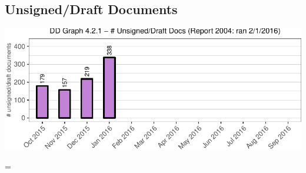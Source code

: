 \documentclass{article}\usepackage[]{graphicx}\usepackage[]{color}
\makeatletter
\def\maxwidth{ %
  \ifdim\Gin@nat@width>\linewidth
    \linewidth
  \else
    \Gin@nat@width
  \fi
}
\newenvironment{knitrout}{}{} %
\newenvironment{absolutelynopagebreak}
  {\par\nobreak\vfil\penalty0\vfilneg
   \vtop\bgroup}
  {\par\xdef\tpd{\the\prevdepth}\egroup
   \prevdepth=\tpd}
\makeatother
\begin{document}
\begin{absolutelynopagebreak}
\subsection{Unsigned/Draft Documents}
\begin{knitrout}
\color{fgcolor}
\includegraphics[width=\maxwidth]{figure/dd_p_unsign-1} 

\end{knitrout}
\end{absolutelynopagebreak}



\end{document}
